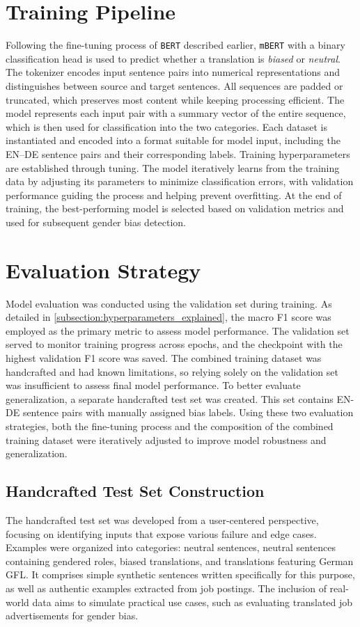 \section{Training Pipeline}
    Following the fine-tuning process of \texttt{BERT} described earlier, \texttt{mBERT} with a binary classification head is used to predict whether a translation is \textit{biased} or \textit{neutral}. The tokenizer encodes input sentence pairs into numerical representations and distinguishes between source and target sentences. All sequences are padded or truncated, which preserves most content while keeping processing efficient. The model represents each input pair with a summary vector of the entire sequence, which is then used for classification into the two categories. Each dataset is instantiated and encoded into a format suitable for model input, including the EN–DE sentence pairs and their corresponding labels. Training hyperparameters are established through tuning. The model iteratively learns from the training data by adjusting its parameters to minimize classification errors, with validation performance guiding the process and helping prevent overfitting. At the end of training, the best-performing model is selected based on validation metrics and used for subsequent gender bias detection.

\section{Evaluation Strategy}
   Model evaluation was conducted using the validation set during training. As detailed in \autoref{subsection:hyperparameters_explained}, the macro F1 score was employed as the primary metric to assess model performance. The validation set served to monitor training progress across epochs, and the checkpoint with the highest validation F1 score was saved. The combined training dataset was handcrafted and had known limitations, so relying solely on the validation set was insufficient to assess final model performance. To better evaluate generalization, a separate handcrafted test set was created. This set contains EN-DE sentence pairs with manually assigned bias labels. Using these two evaluation strategies, both the fine-tuning process and the composition of the combined training dataset were iteratively adjusted to improve model robustness and generalization.

\subsection{Handcrafted Test Set Construction} \label{subsection:eval_dataset}
    The handcrafted test set was developed from a user-centered perspective, focusing on identifying inputs that expose various failure and edge cases. Examples were organized into categories: neutral sentences, neutral sentences containing gendered roles, biased translations, and translations featuring German GFL. It comprises simple synthetic sentences written specifically for this purpose, as well as authentic examples extracted from job postings. The inclusion of real-world data aims to simulate practical use cases, such as evaluating translated job advertisements for gender bias.

